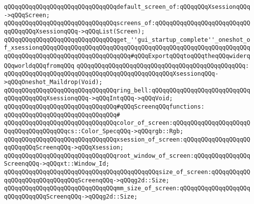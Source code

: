 \newline
\newline
\verb|qQQqqQQqqQQqqQQqqQQqqQQqqQQqqQQqdefault_screen_of:qQQqqQQqXsessionqQQq->qQQqScreen;|\newline
\verb|qQQqqQQqqQQqqQQqqQQqqQQqqQQqqQQqscreens_of:qQQqqQQqqQQqqQQqqQQqqQQqqQQqqQQqqQQqXsessionqQQq->qQQqList(Screen);|\newline
\newline
\verb|qQQqqQQqqQQqqQQqqQQqqQQqqQQqqQQqget_''gui_startup_complete''_oneshot_of_xsessionqQQqqQQqqQQqqQQqqQQqqQQqqQQqqQQqqQQqqQQqqQQqqQQqqQQqqQQqqQQqqQQqqQQqqQQqqQQqqQQqqQQqqQQqqQQqqQQq#qQQqExportqQQqtoqQQqtheqQQqwiderqQQqworldqQQqfromqQQq|\newline
\verb|qQQqqQQqqQQqqQQqqQQqqQQqqQQqqQQqqQQqqQQqqQQqqQQq:|\newline
\verb|qQQqqQQqqQQqqQQqqQQqqQQqqQQqqQQqqQQqqQQqqQQqqQQqXsessionqQQq->qQQqOneshot_Maildrop(Void);|\newline
\newline
\verb|qQQqqQQqqQQqqQQqqQQqqQQqqQQqqQQqring_bell:qQQqqQQqqQQqqQQqqQQqqQQqqQQqqQQqqQQqqQQqXsessionqQQq->qQQqIntqQQq->qQQqVoid;|\newline
\newline
\newline
\verb|qQQqqQQqqQQqqQQqqQQqqQQqqQQqqQQq#qQQqScreenqQQqfunctions:|\newline
\verb|qQQqqQQqqQQqqQQqqQQqqQQqqQQqqQQq#|\newline
\verb|qQQqqQQqqQQqqQQqqQQqqQQqqQQqqQQqcolor_of_screen:qQQqqQQqqQQqqQQqqQQqqQQqqQQqqQQqqQQqqQQqcs::Color_SpecqQQq->qQQqrgb::Rgb;|\newline
\newline
\verb|qQQqqQQqqQQqqQQqqQQqqQQqqQQqqQQqxsession_of_screen:qQQqqQQqqQQqqQQqqQQqqQQqqQQqScreenqQQq->qQQqXsession;|\newline
\verb|qQQqqQQqqQQqqQQqqQQqqQQqqQQqqQQqroot_window_of_screen:qQQqqQQqqQQqqQQqScreenqQQq->qQQqxt::Window_Id;|\newline
\newline
\verb|qQQqqQQqqQQqqQQqqQQqqQQqqQQqqQQqqQQqqQQqqQQqsize_of_screen:qQQqqQQqqQQqqQQqqQQqqQQqqQQqqQQqScreenqQQq->qQQqg2d::Size;|\newline
\verb|qQQqqQQqqQQqqQQqqQQqqQQqqQQqqQQqmm_size_of_screen:qQQqqQQqqQQqqQQqqQQqqQQqqQQqqQQqScreenqQQq->qQQqg2d::Size;|\newline
\newline
